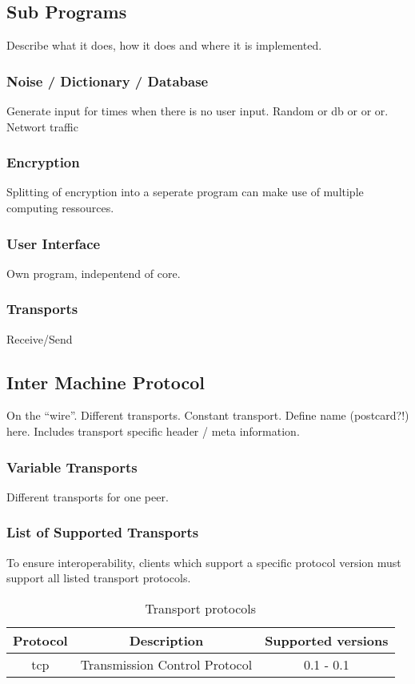\subsection{Sub Programs}
Describe what it does, how it does and where it is implemented.
\subsubsection{Noise / Dictionary / Database}
Generate input for times when there is no user input.
Random or db or or or.
Networt traffic
\subsubsection{Encryption}
Splitting of encryption into a seperate program can make use of
multiple computing ressources.
\subsubsection{User Interface}
Own program, indepentend of core.
\subsubsection{Transports}
Receive/Send

\subsection{Inter Machine Protocol}
On the "`wire"'. Different transports. Constant transport.
Define name (postcard?!) here. Includes transport specific
header / meta information.

\subsubsection{Variable Transports}
Different transports for one peer.
\subsubsection{List of Supported Transports}
To ensure interoperability, clients which support a specific
protocol version must support all listed transport protocols.
\begin{longtable}{|c|c|c|}
\caption{Transport protocols}\\
\hline
\textbf{Protocol} & \textbf{Description} & \textbf{Supported versions}\\
\hline
tcp & Transmission Control Protocol & 0.1 - 0.1\\
\hline
\end{longtable}

